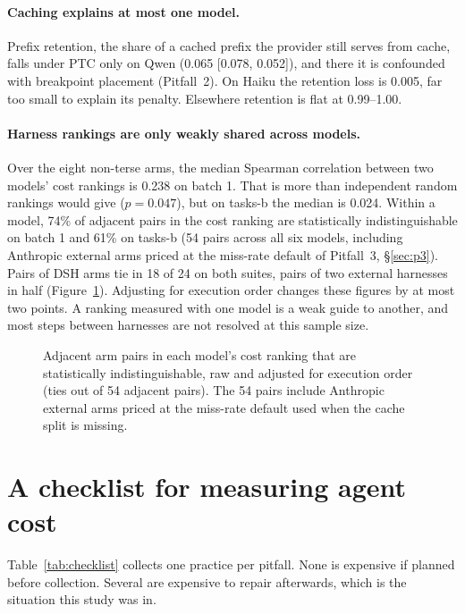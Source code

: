 \documentclass[10pt]{article}
\newcommand*{\mi}{\textminus}   %
\begin{document}
\paragraph{Caching explains at most one model.} Prefix retention, the share of a cached prefix the
provider still serves from cache, falls under PTC only on Qwen (\mi{}0.065 [\mi{}0.078, \mi{}0.052]),
and there it is confounded with breakpoint placement (Pitfall~2). On Haiku the retention loss is
\mi{}0.005, far too small to explain its penalty. Elsewhere retention is flat at 0.99--1.00.

\paragraph{Harness rankings are only weakly shared across models.} Over the eight non-terse arms, the
median Spearman correlation between two models' cost rankings is 0.238 on batch 1. That is more than
independent random rankings would give ($p = 0.047$), but on tasks-b the median is 0.024. Within a
model, 74\% of adjacent pairs in the cost ranking are statistically indistinguishable on batch 1 and
61\% on tasks-b (54 pairs across all six models, including Anthropic external arms priced at the
miss-rate default of Pitfall~3, \S\ref{sec:p3}). Pairs of DSH arms tie in 18 of 24 on both suites, pairs of two external harnesses in
half (Figure~\ref{fig:ties}). Adjusting for execution order changes these figures by at most two
points. A ranking measured with one model is a weak guide to another, and most steps between harnesses
are not resolved at this sample size.

\begin{figure}[htbp]\centering
\caption{Adjacent arm pairs in each model's cost ranking that are statistically indistinguishable, raw
and adjusted for execution order (ties out of 54 adjacent pairs). The 54 pairs include Anthropic
external arms priced at the miss-rate default used when the cache split is missing.}\label{fig:ties}\end{figure}

\section{A checklist for measuring agent cost}\label{sec:checklist}

Table~\ref{tab:checklist} collects one practice per pitfall. None is expensive if planned before
collection. Several are expensive to repair afterwards, which is the situation this study was in.
\end{document}
